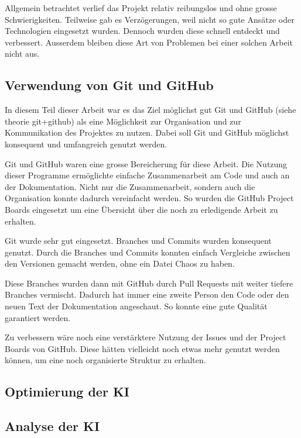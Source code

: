 Allgemein betrachtet verlief das Projekt relativ reibungslos und ohne grosse
Schwierigkeiten. Teilweise gab es Verzögerungen, weil nicht so gute Ansätze oder
Technologien eingesetzt wurden. Dennoch wurden diese schnell entdeckt und
verbessert. Ausserdem bleiben diese Art von Problemen bei einer solchen Arbeit
nicht aus.


\subsection*{Verwendung von Git und GitHub}
In diesem Teil dieser Arbeit war es das Ziel möglichst gut Git und GitHub (siehe
theorie git+github)  %
als eine Möglichkeit zur Organisation und zur Kommunikation des Projektes zu
nutzen. Dabei soll Git und GitHub möglichst konsequent und umfangreich genutzt
werden.

Git und GitHub waren eine grosse Bereicherung für diese Arbeit. Die
Nutzung dieser Programme ermöglichte einfache Zusammenarbeit am Code und auch an
der Dokumentation. Nicht nur die Zusammenarbeit, sondern auch die Organisation
konnte dadurch vereinfacht werden. So wurden die GitHub Project Boards
eingesetzt um eine Übersicht über die noch zu erledigende Arbeit zu erhalten.

Git wurde sehr gut eingesetzt. Branches und Commits wurden konsequent genutzt.
Durch die Branches und Commits konnten einfach Vergleiche zwischen den Versionen
gemacht werden, ohne ein Datei Chaos zu haben.

Diese Branches wurden dann mit GitHub durch Pull Requests mit weiter tiefere
Branches vermischt. Dadurch hat immer eine zweite Person den Code oder den neuen
Text der Dokumentation angeschaut. So konnte eine gute Qualität garantiert
werden.


Zu verbessern wäre noch eine verstärktere Nutzung der Issues und der Project
Boards von GitHub. Diese hätten vielleicht noch etwas mehr genutzt werden
können, um eine noch organisierte Struktur zu erhalten.



\subsection*{Optimierung der KI}


\subsection*{Analyse der KI}
